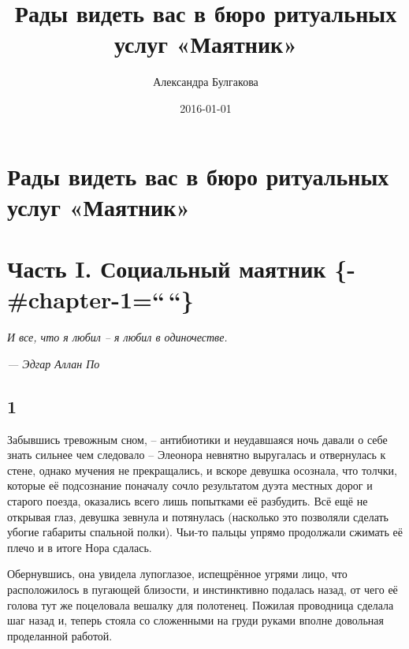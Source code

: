 \documentclass[
  a5paperpaper,
  DIV=11,
  numbers=noendperiod]{scrreprt}
\title{Рады видеть вас в бюро ритуальных услуг «Маятник»}
\author{Александра Булгакова}
\date{2016-01-01}
\renewcommand*\contentsname{Table of contents}
\newcommand\contentsname{Table of contents}
\begin{document}
\maketitle

\renewcommand*\contentsname{Table of contents}
{
\hypersetup{linkcolor=}
\setcounter{tocdepth}{1}
\tableofcontents
}

\chapter{Рады видеть вас в бюро ритуальных услуг
«Маятник»}\label{ux440ux430ux434ux44b-ux432ux438ux434ux435ux442ux44c-ux432ux430ux441-ux432-ux431ux44eux440ux43e-ux440ux438ux442ux443ux430ux43bux44cux43dux44bux445-ux443ux441ux43bux443ux433-ux43cux430ux44fux442ux43dux438ux43a}


\chapter{Часть I. Социальный маятник
\{-\#chapter-1=``\,``\}}\label{ux447ux430ux441ux442ux44c-i.-ux441ux43eux446ux438ux430ux43bux44cux43dux44bux439-ux43cux430ux44fux442ux43dux438ux43a--chapter-1}

\emph{И все, что я любил -- я любил в одиночестве.}

\emph{--- Эдгар Аллан По}

\section*{1}\label{1}


Забывшись тревожным сном, -- антибиотики и неудавшаяся ночь давали о
себе знать сильнее чем следовало -- Элеонора невнятно выругалась и
отвернулась к стене, однако мучения не прекращались, и вскоре девушка
осознала, что толчки, которые её подсознание поначалу сочло результатом
дуэта местных дорог и старого поезда, оказались всего лишь попытками её
разбудить. Всё ещё не открывая глаз, девушка зевнула и потянулась
(насколько это позволяли сделать убогие габариты спальной полки). Чьи-то
пальцы упрямо продолжали сжимать её плечо и в итоге Нора сдалась.

Обернувшись, она увидела лупоглазое, испещрённое угрями лицо, что
расположилось в пугающей близости, и инстинктивно подалась назад, от
чего её голова тут же поцеловала вешалку для полотенец. Пожилая
проводница сделала шаг назад и, теперь стояла со сложенными на груди
руками вполне довольная проделанной работой.
\end{document}
